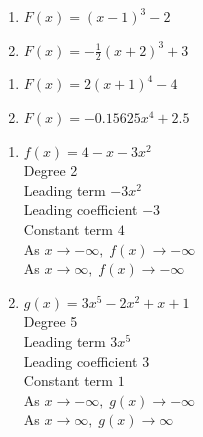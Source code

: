 \begin{multicols}{2}
\begin{enumerate}
\setcounter{enumi}{\value{HW}}

\item  $F(x) = (x-1)^3-2$ 
\item $F(x) = -\frac{1}{2} (x+2)^3+3$

\setcounter{HW}{\value{enumi}}
\end{enumerate}
\end{multicols}

\begin{multicols}{2}
\begin{enumerate}
\setcounter{enumi}{\value{HW}}

\item  $F(x) = 2(x+1)^4-4$ \
\item $F(x) = -0.15625x^4+2.5$

\setcounter{HW}{\value{enumi}}
\end{enumerate}
\end{multicols}


\begin{multicols}{2}
\begin{enumerate}
\setcounter{enumi}{\value{HW}}
\item $f(x) = 4-x-3x^2$ \\
Degree 2 \\
Leading term $-3x^{2}$\\
Leading coefficient $-3$\\
Constant term $4$\\
As $x \rightarrow -\infty, \; f(x) \rightarrow -\infty$\\
As $x \rightarrow \infty, \; f(x) \rightarrow -\infty$\\

\item  $g(x) = 3x^5 - 2x^2 + x + 1$ \\
Degree 5 \\
Leading term $3x^5$\\
Leading coefficient $3$\\
Constant term $1$\\
As $x \rightarrow -\infty, \; g(x) \rightarrow -\infty$\\
As $x \rightarrow \infty, \; g(x) \rightarrow \infty$\\


\setcounter{HW}{\value{enumi}}
\end{enumerate}
\end{multicols}

